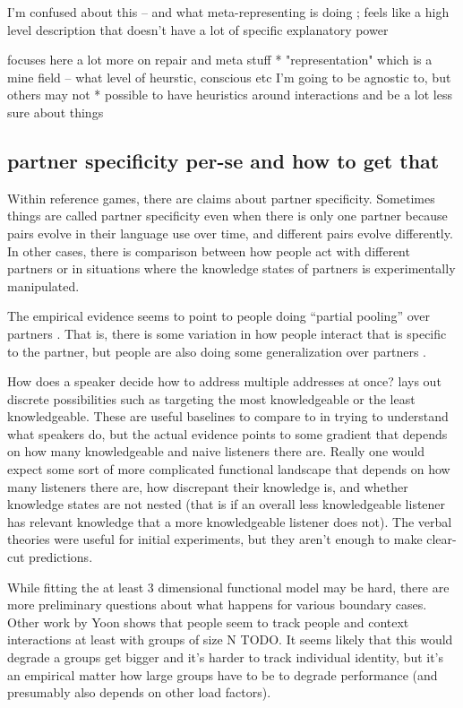 \documentclass[]{article}
\begin{document}
I'm confused about this -- and what meta-representing is doing ; feels like a high level description that doesn't have a lot of specific explanatory power

focuses here a lot more on repair and meta stuff 
* "representation" which is a mine field -- what level of heurstic, conscious etc I'm going to be agnostic to, but others may not
* possible to have heuristics around interactions and be a lot less sure about things

\subsection{partner specificity per-se and how to get that}
Within reference games, there are claims about partner specificity. Sometimes things are called partner specificity even when there is only one partner because pairs evolve in their language use over time, and different pairs evolve differently. In other cases, there is comparison between how people act with different partners or in situations where the knowledge states of partners is experimentally manipulated. 

The empirical evidence seems to point to people doing ``partial pooling'' over partners \cite{hawkins2021}. That is, there is some variation in how people interact that is specific to the partner, but people are also doing some generalization over partners \cite{yoon2014}. 

How does a speaker decide how to address multiple addresses at once? \cite{yoon2018} lays out discrete possibilities such as targeting the most knowledgeable or the least knowledgeable. These are useful baselines to compare to in trying to understand what speakers do, but the actual evidence points to some gradient that depends on how many knowledgeable and naive listeners there are.  Really one would expect some sort of more complicated functional landscape that depends on how many listeners there are, how discrepant their knowledge is, and whether knowledge states are not nested (that is if an overall less knowledgeable listener has relevant knowledge that a more knowledgeable listener does not). The verbal theories were useful for initial experiments, but they aren't enough to make clear-cut predictions. 

While fitting the at least 3 dimensional functional model may be hard, there are more preliminary questions about what happens for various boundary cases. Other work by Yoon shows that people seem to track people and context interactions at least with groups of size N TODO. It seems likely that this would degrade a groups get bigger and it's harder to track individual identity, but it's an empirical matter how large groups have to be to degrade performance (and presumably also depends on other load factors). 
\end{document}
